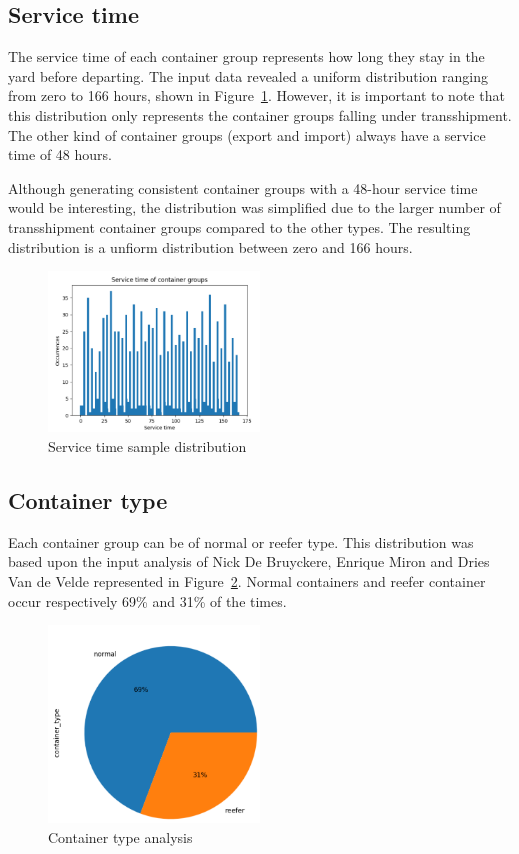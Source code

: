 \documentclass{article}
\begin{document}
\subsection{Service time}
The service time of each container group represents how long they stay in the
yard before departing. The input data revealed a uniform distribution ranging
from zero to 166 hours, shown in Figure~\ref{fig: service sample distribution}.
However, it is important to note that this distribution only represents the
container groups falling under transshipment. The other kind of container
groups (export and import) always have a service time of 48 hours.

Although generating consistent container groups with a 48-hour service time
would be interesting, the distribution was simplified due to the larger number
of transshipment container groups compared to the other types. The resulting
distribution is a unfiorm distribution between zero and 166 hours.

\begin{figure}
    \centering
    \includegraphics[width=0.5\textwidth]{fig/service time analysis.png}
    \caption{Service time sample distribution}\label{fig: service sample distribution}
\end{figure}

\subsection{Container type}
Each container group can be of normal or reefer type. This distribution was
based upon the input analysis of Nick De Bruyckere, Enrique Miron and Dries Van
de Velde represented in Figure~\ref{fig:container type analysis}. Normal
containers and reefer container occur respectively 69\% and 31\% of the times.

\begin{figure}
    \centering
    \includegraphics[width=0.5\textwidth]{fig/container_type.png}
    \caption{Container type analysis}\label{fig:container type analysis}
\end{figure}
\end{document}
